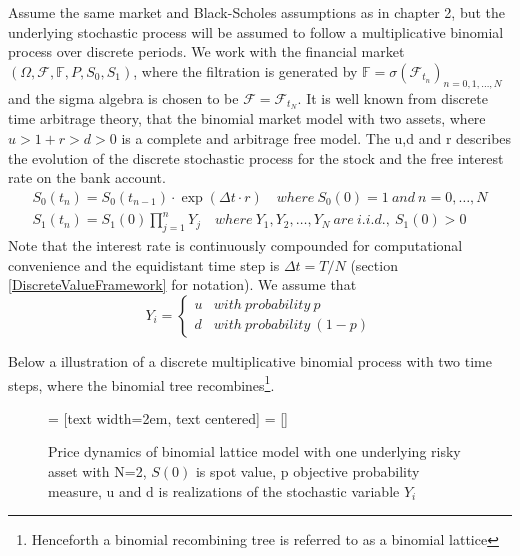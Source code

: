 Assume the same market and Black-Scholes assumptions as in chapter 2, but the underlying stochastic process will be assumed to follow a multiplicative binomial process over discrete periods. We work with the financial market $(\Omega, \mathcal{F}, \mathbb{F}, P, S_0, S_1)$, where the filtration is generated by $\mathbb{F}= \sigma(\mathcal{F}_{t_n})_{n=0,1,\ldots, N}$ and the sigma algebra is chosen to be $\mathcal{F}=\mathcal{F}_{t_{N}}$. It is well known from discrete time arbitrage theory, that the binomial market model with two assets, where $u>1+r>d>0$ is a complete and arbitrage free model. The u,d and r describes the evolution of the discrete stochastic process for the stock and the free interest rate on the bank account. 
\begin{align*}
S_{0}(t_n)=S_{0}(t_{n-1}) \cdot \exp(\Delta t \cdot r) \quad where \ S_{0}(0)=1 \ and \ n=0, \ldots, N\\
S_{1}(t_n)=S_{1}(0)\prod_{j=1}^{n} Y_{j} \quad where \ Y_1,Y_2, \ldots, Y_N \ are \ i.i.d., \ S_1(0)>0
\end{align*}
Note that the interest rate is continuously compounded for computational convenience and the equidistant time step is $\Delta t=T/N$ (section \ref{DiscreteValueFramework} for notation). We assume that \[ Y_i = \begin{cases} 
      u & with \ probability \ p \\
      d & with \ probability \ (1-p)
   \end{cases}
\]

Below a illustration of a discrete multiplicative binomial process with two time steps, where the binomial tree recombines\footnote{Henceforth a binomial recombining tree is referred to as a binomial lattice}.\\

\begin{figure}[H]
\centering
 = [text width=2em, text centered]
 = []
\decoRule
\caption[Two Dimensional Binomial Lattice]{Price dynamics of binomial lattice model with one underlying risky asset with N=2, $S(0)$ is spot value, p objective probability measure, u and d is realizations of the stochastic variable $Y_i$}
\label{fig:twoDimLattice}
\end{figure}

